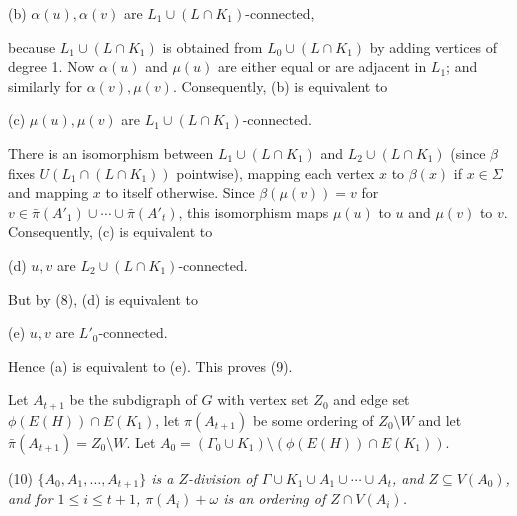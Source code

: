 \hspace*{12pt}(b) $\alpha(u), \alpha(v)$ are $L_1 \cup (L \cap K_1)$-connected,

because $L_1 \cup (L \cap K_1)$ is obtained from $L_0 \cup (L \cap K_1)$ by adding vertices of degree 1. Now $\alpha(u)$ and $\mu(u)$ are either equal or are adjacent in $L_1$; and similarly for $\alpha(v), \mu(v)$. Consequently, (b) is equivalent to

\hspace*{12pt}(c) $\mu(u), \mu(v)$ are $L_1 \cup (L \cap K_1)$-connected.

There is an isomorphism between $L_1 \cup (L \cap K_1)$ and $L_2 \cup (L \cap K_1)$ (since $\beta$ fixes $U(L_1 \cap (L \cap K_1))$ pointwise), mapping each vertex $x$ to $\beta(x)$ if $x \in \Sigma$ and mapping $x$ to itself otherwise. Since $\beta(\mu(v)) = v$ for $v \in \bar{\pi}(A'_1) \cup \cdots \cup \bar{\pi}(A'_t)$, this isomorphism maps $\mu(u)$ to $u$ and $\mu(v)$ to $v$. Consequently, (c) is equivalent to

\hspace*{12pt}(d) $u, v$ are $L_2 \cup (L \cap K_1)$-connected.

But by (8), (d) is equivalent to

\hspace*{12pt}(e) $u, v$ are $L'_0$-connected.

Hence (a) is equivalent to (e). This proves (9).

Let $A_{t+1}$ be the subdigraph of $G$ with vertex set $Z_0$ and edge set $\phi(E(H)) \cap E(K_1)$, let $\pi(A_{t+1})$ be some ordering of $Z_0 \setminus W$ and let $\bar{\pi}(A_{t+1}) = Z_0 \setminus W$. Let $A_0 = (\Gamma_0 \cup K_1) \setminus (\phi(E(H)) \cap E(K_1))$.

\hspace*{12pt}(10) \textit{$\{A_0, A_1, \ldots, A_{t+1}\}$ is a $Z$-division of $\Gamma \cup K_1 \cup A_1 \cup \cdots \cup A_t$, and $Z \subseteq V(A_0)$, and for $1 \le i \le t+1$, $\pi(A_i) + \omega$ is an ordering of $Z \cap V(A_i)$.}
